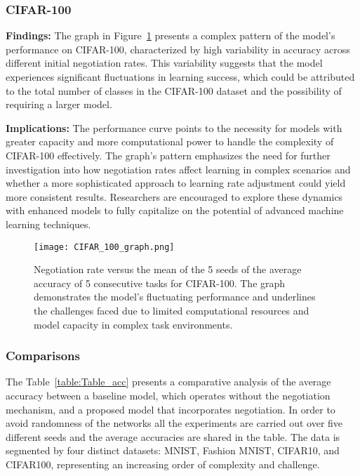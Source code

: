 \documentclass{article}
\begin{document}
\subsubsection{CIFAR-100}
\textbf{Findings:} The graph in Figure~\ref{fig:CIFAR_100_graph} presents a complex pattern of the model's performance on CIFAR-100, characterized by high variability in accuracy across different initial negotiation rates. This variability suggests that the model experiences significant fluctuations in learning success, which could be attributed to the total number of classes in the CIFAR-100 dataset and the possibility of requiring a larger model.

\textbf{Implications:} The performance curve points to the necessity for models with greater capacity and more computational power to handle the complexity of CIFAR-100 effectively. The graph's pattern emphasizes the need for further investigation into how negotiation rates affect learning in complex scenarios and whether a more sophisticated approach to learning rate adjustment could yield more consistent results. Researchers are encouraged to explore these dynamics with enhanced models to fully capitalize on the potential of advanced machine learning techniques. 

\begin{figure}[htbp]
\centering
\texttt{[image: CIFAR\_100\_graph.png]}
\caption{Negotiation rate versus the mean of the 5 seeds of the average accuracy of 5 consecutive tasks for CIFAR-100. The graph demonstrates the model's fluctuating performance and underlines the challenges faced due to limited computational resources and model capacity in complex task environments.}
\label{fig:CIFAR_100_graph}
\end{figure}


\subsubsection{Comparisons}

The Table~\ref{table:Table_acc} presents a comparative analysis of the average accuracy between a baseline model, which operates without the negotiation mechanism, and a proposed model that incorporates negotiation. In order to avoid randomness of the networks all the experiments are carried out over five different seeds and the average accuracies are shared in the table. The data is segmented by four distinct datasets: MNIST, Fashion MNIST, CIFAR10, and CIFAR100, representing an increasing order of complexity and challenge.
\end{document}
